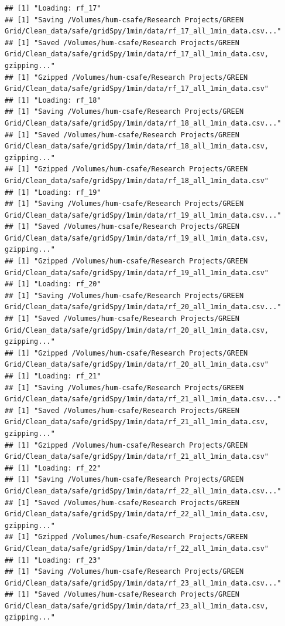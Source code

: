\documentclass[]{article}
\begin{document}
\begin{verbatim}
## [1] "Loading: rf_17"
## [1] "Saving /Volumes/hum-csafe/Research Projects/GREEN Grid/Clean_data/safe/gridSpy/1min/data/rf_17_all_1min_data.csv..."
## [1] "Saved /Volumes/hum-csafe/Research Projects/GREEN Grid/Clean_data/safe/gridSpy/1min/data/rf_17_all_1min_data.csv, gzipping..."
## [1] "Gzipped /Volumes/hum-csafe/Research Projects/GREEN Grid/Clean_data/safe/gridSpy/1min/data/rf_17_all_1min_data.csv"
## [1] "Loading: rf_18"
## [1] "Saving /Volumes/hum-csafe/Research Projects/GREEN Grid/Clean_data/safe/gridSpy/1min/data/rf_18_all_1min_data.csv..."
## [1] "Saved /Volumes/hum-csafe/Research Projects/GREEN Grid/Clean_data/safe/gridSpy/1min/data/rf_18_all_1min_data.csv, gzipping..."
## [1] "Gzipped /Volumes/hum-csafe/Research Projects/GREEN Grid/Clean_data/safe/gridSpy/1min/data/rf_18_all_1min_data.csv"
## [1] "Loading: rf_19"
## [1] "Saving /Volumes/hum-csafe/Research Projects/GREEN Grid/Clean_data/safe/gridSpy/1min/data/rf_19_all_1min_data.csv..."
## [1] "Saved /Volumes/hum-csafe/Research Projects/GREEN Grid/Clean_data/safe/gridSpy/1min/data/rf_19_all_1min_data.csv, gzipping..."
## [1] "Gzipped /Volumes/hum-csafe/Research Projects/GREEN Grid/Clean_data/safe/gridSpy/1min/data/rf_19_all_1min_data.csv"
## [1] "Loading: rf_20"
## [1] "Saving /Volumes/hum-csafe/Research Projects/GREEN Grid/Clean_data/safe/gridSpy/1min/data/rf_20_all_1min_data.csv..."
## [1] "Saved /Volumes/hum-csafe/Research Projects/GREEN Grid/Clean_data/safe/gridSpy/1min/data/rf_20_all_1min_data.csv, gzipping..."
## [1] "Gzipped /Volumes/hum-csafe/Research Projects/GREEN Grid/Clean_data/safe/gridSpy/1min/data/rf_20_all_1min_data.csv"
## [1] "Loading: rf_21"
## [1] "Saving /Volumes/hum-csafe/Research Projects/GREEN Grid/Clean_data/safe/gridSpy/1min/data/rf_21_all_1min_data.csv..."
## [1] "Saved /Volumes/hum-csafe/Research Projects/GREEN Grid/Clean_data/safe/gridSpy/1min/data/rf_21_all_1min_data.csv, gzipping..."
## [1] "Gzipped /Volumes/hum-csafe/Research Projects/GREEN Grid/Clean_data/safe/gridSpy/1min/data/rf_21_all_1min_data.csv"
## [1] "Loading: rf_22"
## [1] "Saving /Volumes/hum-csafe/Research Projects/GREEN Grid/Clean_data/safe/gridSpy/1min/data/rf_22_all_1min_data.csv..."
## [1] "Saved /Volumes/hum-csafe/Research Projects/GREEN Grid/Clean_data/safe/gridSpy/1min/data/rf_22_all_1min_data.csv, gzipping..."
## [1] "Gzipped /Volumes/hum-csafe/Research Projects/GREEN Grid/Clean_data/safe/gridSpy/1min/data/rf_22_all_1min_data.csv"
## [1] "Loading: rf_23"
## [1] "Saving /Volumes/hum-csafe/Research Projects/GREEN Grid/Clean_data/safe/gridSpy/1min/data/rf_23_all_1min_data.csv..."
## [1] "Saved /Volumes/hum-csafe/Research Projects/GREEN Grid/Clean_data/safe/gridSpy/1min/data/rf_23_all_1min_data.csv, gzipping..."

\end{verbatim}
\end{document}
